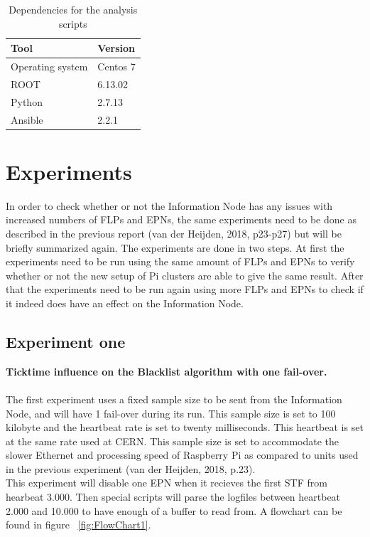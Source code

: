 \begin{table}[ht]
\begin{tabular}{| l | l |}
\hline
Tool & Version \\ \hline
Operating system & Centos 7 \\ \hline
ROOT & 6.13.02 \\ \hline
Python & 2.7.13 \\ \hline
Ansible & 2.2.1 \\ \hline
\end{tabular}
\caption{Dependencies for the analysis scripts}
\label{table:AnalysisDependencies}
\end{table}

\newpage

\section{Experiments}
In order to check whether or not the Information Node has any issues with increased numbers of FLPs and EPNs, the same experiments need to be done as described in the previous report (van der Heijden, 2018, p23-p27) but will be briefly summarized again. The experiments are done in two steps. At first the experiments need to be run using the same amount of FLPs and EPNs to verify whether or not the new setup of Pi clusters are able to give the same result. After that the experiments need to be run again using more FLPs and EPNs to check if it indeed does have an effect on the Information Node.

\subsection{Experiment one}
\textbf{Ticktime influence on the Blacklist algorithm with one fail-over.}
\\~\\
The first experiment uses a fixed sample size to be sent from the Information Node, and will have 1 fail-over during its run. This sample size is set to 100 kilobyte and the heartbeat rate is set to twenty milliseconds. This heartbeat is set at the same rate used at CERN. This sample size is set to accommodate the slower Ethernet and processing speed of Raspberry Pi as compared to units used in the previous experiment (van der Heijden, 2018, p.23). \\
This experiment will disable one EPN when it recieves the first STF from hearbeat 3.000. Then special scripts will parse the logfiles between heartbeat 2.000 and 10.000 to have enough of a buffer to read from. A flowchart can be found in figure ~\ref{fig:FlowChart1}.

